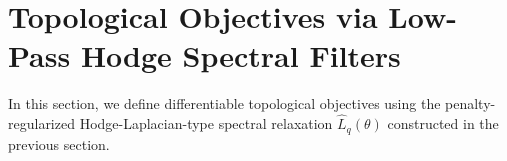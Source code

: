 \documentclass[pdflatex,sn-mathphys-ay]{sn-jnl}%
\theoremstyle{thmstyleone}%
\theoremstyle{thmstyletwo}%
\theoremstyle{thmstylethree}%
\begin{document}
















\section{Topological Objectives via Low-Pass Hodge Spectral Filters}

In this section, we define differentiable topological objectives using the penalty-regularized Hodge-Laplacian-type spectral relaxation \(\widehat{L}_q(\theta)\) constructed in the previous section.
\end{document}
